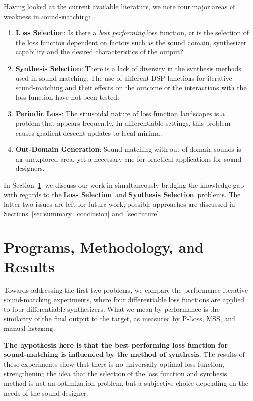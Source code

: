 \documentclass[lettersize,journal]{IEEEtran}
\newcommand{\LossSelect}{\textbf{Loss Selection}}
\newcommand{\SynthSelect}{\textbf{Synthesis Selection}}
\newcommand{\PeriodicLoss}{\textbf{Periodic Loss}}
\newcommand{\OutDomain}{\textbf{Out-Domain Generation}}
\begin{document}

Having looked at the current available literature, we note four major areas of weakness in sound-matching:
\begin{enumerate}
    \item \LossSelect: Is there a \textit{best performing} loss function, or is the selection of the loss function dependent on factors such as the sound domain, synthesizer capability and the desired characteristics of the output? 
    \item \SynthSelect: There is a lack of diversity in the synthesis methods used in sound-matching. The use of different DSP functions for iterative sound-matching and their effects on the outcome or the interactions with the loss function have not been tested.
    \item \PeriodicLoss: The sinusoidal nature of loss function landscapes is a problem that appears frequently. In differentiable settings, this problem causes gradient descent updates to local minima. 
    \item \OutDomain: Sound-matching with out-of-domain sounds is an unexplored area, yet a necessary one for practical applications for sound designers.
\end{enumerate}

In Section~\ref{sec:progs_methodology_results}, we discuss our work in simultaneously bridging the knowledge gap with regards to the \LossSelect~and \SynthSelect~problems. The latter two issues are left for future work; possible approaches are discussed in Sections~\ref{sec:summary_conclusion} and~\ref{sec:future}.


\section{Programs, Methodology, and Results}
\label{sec:progs_methodology_results}
Towards addressing the first two problems, we compare the performance iterative sound-matching experiments, where four differentiable loss functions are applied to four differentiable synthesizers. What we mean by performance is the similarity of the final output to the target, as measured by P-Loss, MSS, and manual listening.

\textbf{The hypothesis here is that the best performing loss function for sound-matching is influenced by the method of synthesis}. The results of these experiments show that there is no universally optimal loss function, strengthening the idea that the selection of the loss function and synthesis method is not an optimization problem, but a subjective choice depending on the needs of the sound designer. 
\end{document}
